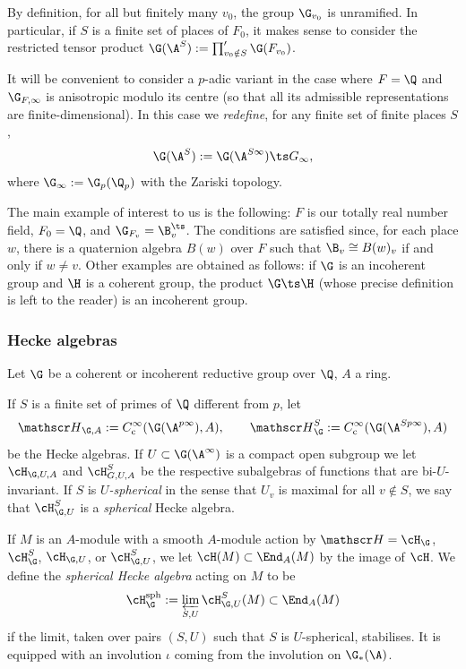   By definition,  for all but finitely many $v_{0}$, the group $\G_{v_{0}}$ is unramified. In particular, if $S$ is a finite set of places of $F_{0}$, it makes sense to consider the restricted tensor product $\G(\A^{S}):= \prod'_{v_{0}\notin S}\G(F_{v_{0}})$.

   It will be convenient to consider a $p$-adic variant in the case where $F=\Q$ and $\G_{F, \infty}$ is anisotropic modulo its centre (so that all its admissible representations are finite-dimensional). In this case we \emph{redefine}, for any finite set of finite places $S$,
  $$\G(\A^{S}):= \G(\A^{S\infty})\ts G_{\infty},$$
  where  $ \G_{\infty}:=\G_{p}(\Q_{p}) $ with the Zariski topology.



The  main example of interest to us is the following: $F$ is our totally real number field, $F_{0}=\Q$, and $\G_{F_{v}}=\B_{v}^{\ts}$. The conditions are satisfied since, for each place $w$, there is a quaternion algebra $B(w)$ over $F$ such that $\B_{v}\cong B(w)_{v}$ if and only if $w\neq v$.   Other examples are obtained as follows: if $\G$ is an incoherent group and $\H$ is a coherent group, the product $\G\ts\H$ (whose precise definition is left to the reader) is an incoherent group.




\subsubsection{Hecke algebras}   Let  ${\G}$ be a coherent or incoherent reductive group over $\Q$, $A$ a ring.

 If  $S$ is a finite set of primes of $\Q$ different from $p$,
let
$${\mathscr H}_{{\G, A}}:=C^{\infty}_{\rm c}({\G}(\A^{p\infty}),A), \qquad {\mathscr H}^{S}_{{\G}}:=C^{\infty}_{\rm c}({\G}(\A^{Sp\infty}),A)$$
be the Hecke algebras. If $U\subset \G(\A^{\infty})$ is a compact open subgroup we let $\cH_{\G,U,A}$ and $\cH_{G, U,
A}^{S}$ be the respective subalgebras of functions that are bi-$U$-invariant. If $S$ is \emph{$U$-spherical} in the sense  that $U_{v}$ is maximal for all $v\notin S$, we say that $ \cH_{\G,U}^{S}$ is a \emph{spherical} Hecke algebra.

If $M$ is an $A$-module with a smooth $A$-module action by ${\mathscr H}= \cH_{{\G}}$, $\cH_{{\G}}^{S}$, $\cH_{{\G},U}$, or  $\cH_{{\G},U}^{S}$, we let $\cH({M})\subset \End_{A}(M)$ by the image of $\cH$. We define the \emph{spherical Hecke algebra} acting on $M$ to be
$$\cH_{\G}^{\rm sph}:=\varprojlim_{S,U} \cH_{{\G},U}^{S}(M)\subset  \End_{A}(M)$$
if the limit, taken over pairs $(S,U)$ such that $S$ is $U$-spherical, stabilises. It is equipped with an involution $\iota $ coming from the involution on $\G_{*}(\A)$.




